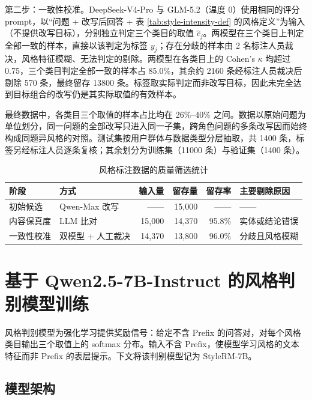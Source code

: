 \documentclass[fontset=fandol,type=master,campus=shenzhen,etitleauto=true]{hithesisbook}
\begin{document}
第二步：一致性校准。DeepSeek-V4-Pro 与 GLM-5.2（温度 0）使用相同的评分 prompt，以“问题 + 改写后回答 + 表 \ref{tab:style-intensity-def} 的风格定义”为输入（不提供改写目标），分别独立判定三个类目的取值 $\hat{c}_j$。两模型在三个类目上判定全部一致的样本，直接以该判定为标签 $y_j$；存在分歧的样本由 2 名标注人员裁决，风格特征模糊、无法判定的剔除。两模型在各类目上的 Cohen's $\kappa$ 均超过 0.75，三个类目判定全部一致的样本占 85.0\%，其余约 2160 条经标注人员裁决后剔除 570 条，最终留存 13800 条。标签取实际判定而非改写目标，因此未完全达到目标组合的改写仍是其实际取值的有效样本。

最终数据中，各类目三个取值的样本占比均在 26\%--40\% 之间。数据以原始问题为单位划分，同一问题的全部改写只进入同一子集，跨角色问题的多条改写因而始终构成同题异风格的对照。测试集按用户群体与数据类型分层抽取，共 1400 条，标签另经标注人员逐条复核；其余划分为训练集（11000 条）与验证集（1400 条）。

\begin{table}[htbp]
\centering
\caption{风格标注数据的质量筛选统计}
\label{tab:style-data-dist}
\small
\setlength{\tabcolsep}{5pt}
\renewcommand{\arraystretch}{1.15}
\begin{tabular}{l l r r r l}
\toprule
\textbf{阶段} & \textbf{方式} & \textbf{输入量} & \textbf{留存量} & \textbf{留存率} & \textbf{主要剔除原因} \\
\midrule
初始候选   & Qwen-Max 改写  &  ——   & 15{,}000 &  ——    &  —— \\
内容保真度 & LLM 比对 & 15{,}000 & 14{,}370 & 95.8\% & 实体或结论错误 \\
一致性校准 & 双模型 + 人工裁决 & 14{,}370 & 13{,}800 & 96.0\% & 分歧且风格模糊 \\
\bottomrule
\end{tabular}

\end{table}

\section{基于 Qwen2.5-7B-Instruct 的风格判别模型训练}\label{ux57faux4e8e-qwen2.5-7b-ux7684ux98ceux683cux5224ux522bux6a21ux578bux8badux7ec3}

风格判别模型为强化学习提供奖励信号：给定不含 Prefix 的问答对，对每个风格类目输出三个取值上的 softmax 分布。输入不含 Prefix，使模型学习风格的文本特征而非 Prefix 的表层提示。下文将该判别模型记为 StyleRM-7B。

\subsection{模型架构}\label{ux6a21ux578bux67b6ux6784ux8bbeux8ba1}
\end{document}
